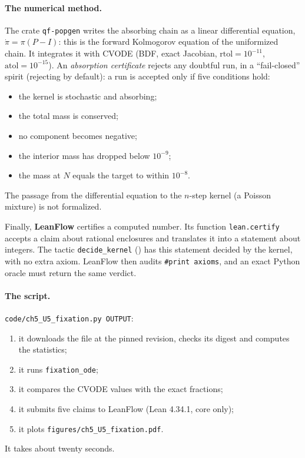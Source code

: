 \paragraph{The numerical method.} The crate \texttt{qf-popgen} writes the absorbing chain as a linear
differential equation, $\dot\pi=\pi(P-I)$: this is the forward Kolmogorov equation of the uniformized chain. It
integrates it with CVODE (BDF, exact Jacobian, $\mathrm{rtol}=10^{-11}$, $\mathrm{atol}=10^{-15}$). An
\emph{absorption certificate} rejects any doubtful run, in a ``fail-closed'' spirit (rejecting by default): a run is
accepted only if five conditions hold:
\begin{itemize}
\item the kernel is stochastic and absorbing;
\item the total mass is conserved;
\item no component becomes negative;
\item the interior mass has dropped below $10^{-9}$;
\item the mass at $N$ equals the target to within $10^{-8}$.
\end{itemize}
The passage from the differential equation to the $n$-step kernel (a Poisson mixture) is not formalized.

Finally, \textbf{LeanFlow} certifies a computed number. Its function \texttt{lean.certify} accepts a claim about
rational enclosures and translates it into a statement about integers. The tactic \texttt{decide\_kernel}
() has this statement decided by the kernel, with no extra axiom. LeanFlow then audits
\texttt{\#print axioms}, and an exact Python oracle must return the same verdict.

\paragraph{The script.} \texttt{code/ch5\_U5\_fixation.py OUTPUT}:
\begin{enumerate}
\item it downloads the file at the pinned revision, checks its digest and computes the statistics;
\item it runs \texttt{fixation\_ode};
\item it compares the CVODE values with the exact fractions;
\item it submits five claims to LeanFlow (Lean 4.34.1, core only);
\item it plots \texttt{figures/ch5\_U5\_fixation.pdf}.
\end{enumerate}
It takes about twenty seconds.

